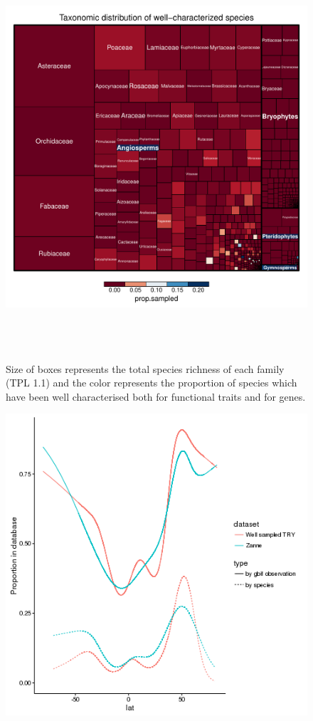 \documentclass[a4paper,11pt]{article}
\begin{document}
\begin{figure}[h!]
\centering
  \includegraphics[width=15cm,height=15cm,keepaspectratio]{figures/treemap_well_known.pdf}
  \caption{Size of boxes represents the total species richness of each family (TPL 1.1) and the color represents the proportion of species which have been 
  well characterised both for functional traits and for genes.}
\end{figure}

\begin{figure}[h!]
\centering
  \includegraphics[width=\textwidth]{figures/multi_gam_zae_diaz.png}
\end{figure}
\end{document}
